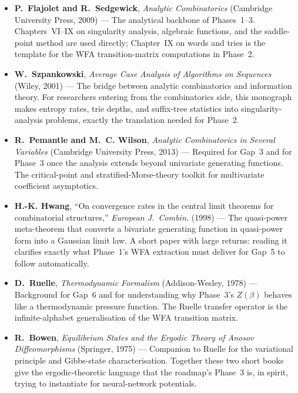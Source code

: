 \begin{itemize}
  \item \textbf{P.~Flajolet and R.~Sedgewick}, \emph{Analytic Combinatorics} (Cambridge University Press, 2009) \cite{FlajoletSedgewick2009} --- The analytical backbone of Phases~1--3. Chapters~VI--IX on singularity analysis, algebraic functions, and the saddle-point method are used directly; Chapter~IX on words and tries is the template for the WFA transition-matrix computations in Phase~2.

  \item \textbf{W.~Szpankowski}, \emph{Average Case Analysis of Algorithms on Sequences} (Wiley, 2001) \cite{Szpankowski2001} --- The bridge between analytic combinatorics and information theory. For researchers entering from the combinatorics side, this monograph makes entropy rates, trie depths, and suffix-tree statistics into singularity-analysis problems, exactly the translation needed for Phase~2.

  \item \textbf{R.~Pemantle and M.~C. Wilson}, \emph{Analytic Combinatorics in Several Variables} (Cambridge University Press, 2013) \cite{PemantleWilson2013} --- Required for Gap~3 and for Phase~3 once the analysis extends beyond univariate generating functions. The critical-point and stratified-Morse-theory toolkit for multivariate coefficient asymptotics.

  \item \textbf{H.-K. Hwang}, ``On convergence rates in the central limit theorems for combinatorial structures,'' \emph{European J.\ Combin.} (1998) \cite{Hwang1998} --- The quasi-power meta-theorem that converts a bivariate generating function in quasi-power form into a Gaussian limit law. A short paper with large returns: reading it clarifies exactly what Phase~1's WFA extraction must deliver for Gap~5 to follow automatically.

  \item \textbf{D.~Ruelle}, \emph{Thermodynamic Formalism} (Addison-Wesley, 1978) \cite{Ruelle1978} --- Background for Gap~6 and for understanding why Phase~3's $Z(\beta)$ behaves like a thermodynamic pressure function. The Ruelle transfer operator is the infinite-alphabet generalisation of the WFA transition matrix.

  \item \textbf{R.~Bowen}, \emph{Equilibrium States and the Ergodic Theory of Anosov Diffeomorphisms} (Springer, 1975) \cite{Bowen1975} --- Companion to Ruelle for the variational principle and Gibbs-state characterisation. Together these two short books give the ergodic-theoretic language that the roadmap's Phase~3 is, in spirit, trying to instantiate for neural-network potentials.
\end{itemize}
